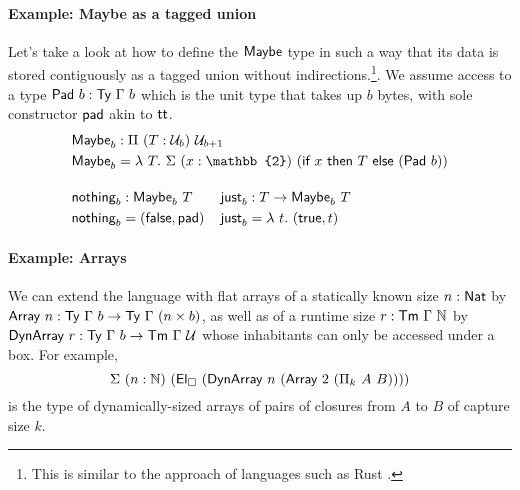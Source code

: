 \paragraph{Example: Maybe as a tagged union}\label{maybe-as-a-tagged-union}

Let's take a look at how to define the \(\textsf{Maybe}\) type in
such a way that its data is stored contiguously as a tagged union without indirections.\footnote{This
is similar to the approach of languages such as Rust \cite{rust-option}.}.
We assume access to a type $\textsf{Pad}\ b : \textsf{Ty}\ \Gamma\ b$ which is the unit type that takes up $b$ bytes, with sole constructor $\textsf{pad}$ akin to $\textsf{tt}$.
\[
\begin{aligned}
&\syn{Maybe}_b : \Pi\ (T : \univ_b)\ \univ_{b + 1} \\
&\syn{Maybe}_b = \lambda\ T.\ \Sigma\ (x : \mathbb{2})\ (\syn{if}\ x\ \syn{then}\ T\ \syn{else}\ (\syn{Pad}\ b)) \\[1em]
&\begin{alignedat}{2}
&\syn{nothing}_b : \syn{Maybe}_b\ T  \qquad && \syn{just}_b : T \to \syn{Maybe}_b\ T \\
&\syn{nothing}_b = (\syn{false}, \syn{pad}) && \syn{just}_b = \lambda\ t.\  (\syn{true}, t)
\end{alignedat}
\end{aligned}
\]

\paragraph{Example: Arrays}\label{arrays}

We can extend the language with flat arrays of a statically known size $n : \textsf{Nat}$ by
$\textsf{Array}\ n : \textsf{Ty}\ \Gamma\ b \to \textsf{Ty}\ \Gamma\ (n \times b)$, as well
as of a runtime size $r : \textsf{Tm}\ \Gamma\ \mathbb{N}$ by $\syn{DynArray}\ r : \Ty\ \Gamma\ b \to \Tm\ \Gamma\ \univ$
whose inhabitants can only be accessed under a box. For example,
\[
\Sigma\ (n : \mathbb{N})\ (\El_\square\ (\syn{DynArray}\ n\ (\syn{Array}\ 2\ (\Pi_k\ A\ B))))
\]
is the type of dynamically-sized arrays of pairs of closures from $A$ to $B$ of capture size $k$.
